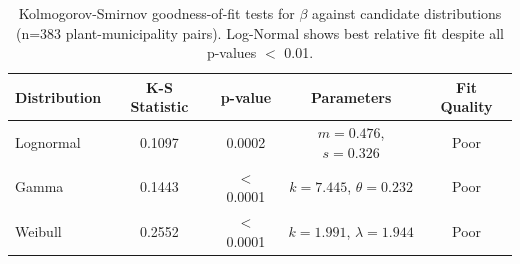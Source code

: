 \begin{table}[htbp]
\caption{Kolmogorov-Smirnov goodness-of-fit tests for $\beta$ against candidate distributions (n=383 plant-municipality pairs). Log-Normal shows best relative fit despite all p-values $<$ 0.01.}
\label{tab:ks_test_plant_municipality}
\centering
\small
\begin{tabular*}{\textwidth}{@{\extracolsep{\fill}}lcccc@{}}
\toprule
Distribution & K-S Statistic & p-value & Parameters & Fit Quality \\
\midrule
Lognormal & 0.1097 & 0.0002 & $m=0.476$, $s=0.326$ & Poor \\
Gamma & 0.1443 & $<$0.0001 & $k=7.445$, $\theta=0.232$ & Poor \\
Weibull & 0.2552 & $<$0.0001 & $k=1.991$, $\lambda=1.944$ & Poor \\
\bottomrule
\end{tabular*}
\end{table}
